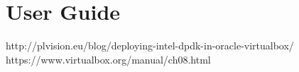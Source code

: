 \documentclass[final_report.tex]{subfiles}
\begin{document}
\section{User Guide}

http://plvision.eu/blog/deploying-intel-dpdk-in-oracle-virtualbox/
https://www.virtualbox.org/manual/ch08.html
\end{document}
